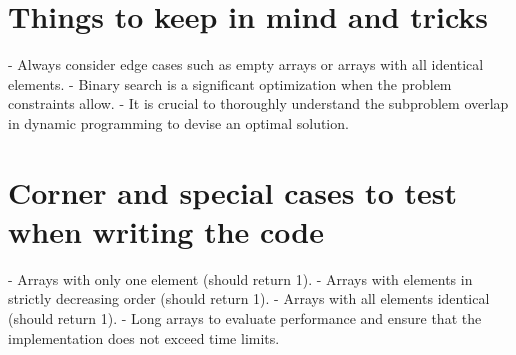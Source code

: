 \section*{Things to keep in mind and tricks}
- Always consider edge cases such as empty arrays or arrays with all identical elements.
- Binary search is a significant optimization when the problem constraints allow.
- It is crucial to thoroughly understand the subproblem overlap in dynamic programming to devise an optimal solution.

\section*{Corner and special cases to test when writing the code}
- Arrays with only one element (should return 1).
- Arrays with elements in strictly decreasing order (should return 1).
- Arrays with all elements identical (should return 1).
- Long arrays to evaluate performance and ensure that the implementation does not exceed time limits.